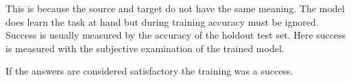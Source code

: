 This is because the source and target do not have the same meaning. The model does learn the task at hand but during training accuracy must be ignored. Success is usually measured by the accuracy of the holdout test set. Here success is measured with the subjective examination of the trained model.

If the answers are considered satisfactory the training was a success. 

